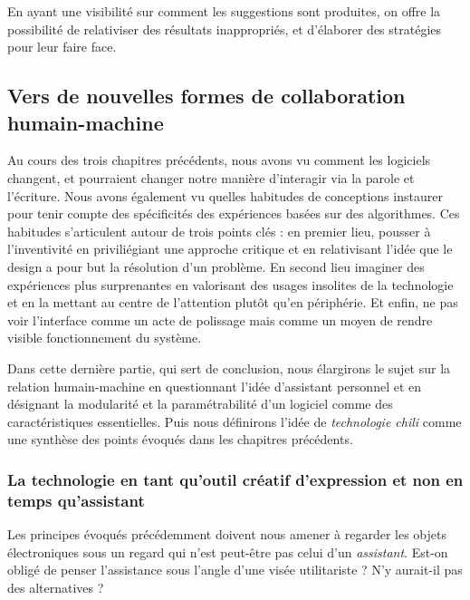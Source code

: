 \documentclass[]{article}
\begin{document}
En ayant une visibilité sur comment les suggestions sont produites, on
offre la possibilité de relativiser des résultats inappropriés, et
d'élaborer des stratégies pour leur faire face.

\newpage

\hypertarget{vers-de-nouvelles-formes-de-collaboration-humain-machine}{%
\subsection{Vers de nouvelles formes de collaboration
humain-machine}\label{vers-de-nouvelles-formes-de-collaboration-humain-machine}}

Au cours des trois chapitres précédents, nous avons vu comment les
logiciels changent, et pourraient changer notre manière d'interagir via
la parole et l'écriture. Nous avons également vu quelles habitudes de
conceptions instaurer pour tenir compte des spécificités des expériences
basées sur des algorithmes. Ces habitudes s'articulent autour de trois
points clés : en premier lieu, pousser à l'inventivité en priviliégiant
une approche critique et en relativisant l'idée que le design a pour but
la résolution d'un problème. En second lieu imaginer des expériences
plus surprenantes en valorisant des usages insolites de la technologie
et en la mettant au centre de l'attention plutôt qu'en périphérie. Et
enfin, ne pas voir l'interface comme un acte de polissage mais comme un
moyen de rendre visible fonctionnement du système.

Dans cette dernière partie, qui sert de conclusion, nous élargirons le
sujet sur la relation humain-machine en questionnant l'idée d'assistant
personnel et en désignant la modularité et la paramétrabilité d'un
logiciel comme des caractéristiques essentielles. Puis nous définirons
l'idée de \emph{technologie chili} comme une synthèse des points évoqués
dans les chapitres précédents.

\hypertarget{la-technologie-en-tant-quoutil-cruxe9atif-dexpression-et-non-en-temps-quassistant}{%
\subsubsection{La technologie en tant qu'outil créatif d'expression et
non en temps
qu'assistant}\label{la-technologie-en-tant-quoutil-cruxe9atif-dexpression-et-non-en-temps-quassistant}}

Les principes évoqués précédemment doivent nous amener à regarder les
objets électroniques sous un regard qui n'est peut-être pas celui d'un
\emph{assistant}. Est-on obligé de penser l'assistance sous l'angle
d'une visée utilitariste ? N'y aurait-il pas des alternatives ?
\end{document}

